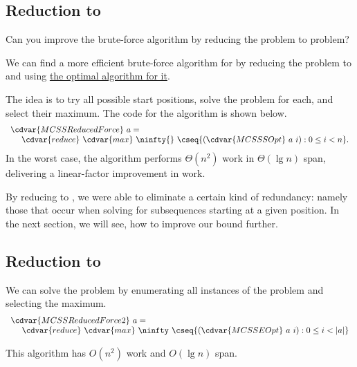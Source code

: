 \subsection{Reduction to \MCSSS{}}


\begin{teachask}
Can you improve the brute-force algorithm by reducing the \MCSS{}
problem to \MCSSS{} problem?
\end{teachask}
%

\begin{algorithm}
\label{alg:mcss::reduction::mcss-red-mcsss}

We can find a more efficient brute-force algorithm for \MCSS{} by
reducing the problem to \MCSSS{} and
using \href{alg:mcss::reduction::mcsss}{the optimal algorithm for it}.

The idea is to try all possible start positions, solve the \MCSSS{}
problem for each, and select their maximum.
%
The code for the algorithm is shown below.
%
\[
\begin{array}{l}
\cdvar{MCSSReducedForce}~a = 
\\
~~~~\cdvar{reduce}~\cdvar{max}~\ninfty{}~\cseq{(\cdvar{MCSSSOpt}~a~i) : 0 \le i < n}.
\end{array}
\]
In the worst case, the algorithm performs $\Theta(n^2)$ work in
$\Theta(\lg{n})$ span, delivering a linear-factor improvement in
work.
\end{algorithm}
%

\begin{remark}
By reducing \MCSS{} to \MCSSS{}, we were able to eliminate a certain
kind of redundancy: namely those that occur when solving for
subsequences starting at a given position.
%
In the next section, we will see, how to improve our bound further.
\end{remark}

\subsection{Reduction to \MCSSE{}}

\begin{algorithm}
\label{alg:mcss::reduction::mcss-red-mcsse}

We can solve the \MCSS{} problem by enumerating all instances of
the \MCSSE{} problem and selecting the maximum.
%
\[
\begin{array}{l}
\cdvar{MCSSReducedForce2}~a=
\\
~~~~\cdvar{reduce}~\cdvar{max}~\ninfty~\cseq{(\cdvar{MCSSEOpt}~a~i) : 0 \le i < |a|}
\end{array}
\]

This algorithm has $O(n^2)$ work and $O(\lg{n})$ span.
\end{algorithm}

